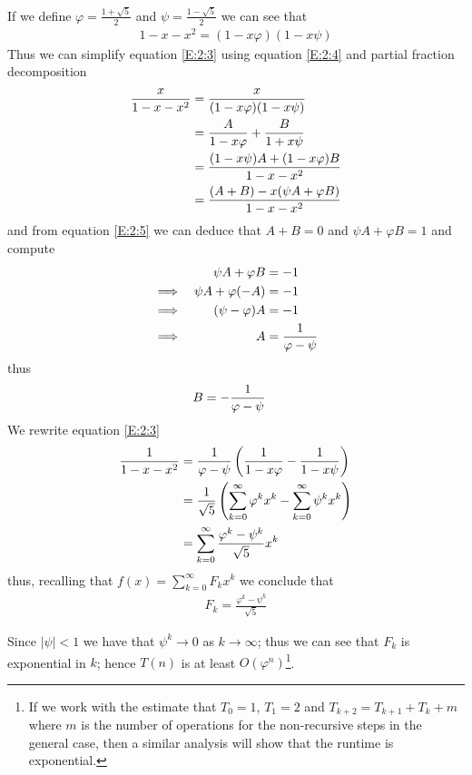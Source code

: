 \documentclass[oneside,12pt]{book}   	%
\newcounter{ex}
\newcounter{def}
\theoremstyle{definition}
\newcommand{\order}[1]{\left| #1 \right|}
\begin{document}
\begin{spacing}{1.618}
			If we define $\varphi=\frac{1+\sqrt{5}}{2}$ and $\psi=\frac{1-\sqrt{5}}{2}$ we can see that
			\begin{alignat}{4}
				1-x-x^2=(1-x\varphi)(1-x\psi) \label{E:2:4}
			\end{alignat}
			Thus we can simplify equation \ref{E:2:3} using equation \ref{E:2:4} and partial fraction decomposition
			\begin{alignat}{4}
				\frac{x}{1-x-x^2}&=\frac{x}{(1-x\varphi)(1-x\psi)} \notag \\
					&=\frac{A}{1-x\varphi}+\frac{B}{1+x\psi} \notag \\
					&=\frac{(1-x\psi)A+(1-x\varphi)B}{1-x-x^2} \notag \\
					&=\frac{(A+B)-x(\psi A+\varphi B)}{1-x-x^2} \label{E:2:5}
			\end{alignat}
			and from equation \ref{E:2:5} we can deduce that $A+B=0$ and $\psi A+\varphi B=1$ and compute
			\begin{alignat}{4}
				&&\psi A+\varphi B&=-1 \notag \\
				\implies && \psi A+ \varphi (-A)&=-1 \notag \\
				\implies && (\psi -\varphi) A &=-1 \notag \\
				\implies && A &=\frac{1}{\varphi-\psi} \notag 
			\end{alignat}
			thus
			\begin{alignat}{4}
				B&=-\frac{1}{\varphi-\psi} \notag
			\end{alignat}
			We rewrite equation \ref{E:2:3}
			\begin{alignat}{4}
				\frac{1}{1-x-x^2}&=\frac{1}{\varphi-\psi}\left(\frac{1}{1-x\varphi}-\frac{1}{1-x\psi}\right) \notag \\
					&=\frac{1}{\sqrt{5}}\left(\sum_{k=0}^\infty \varphi^kx^k - \sum_{k=0}^\infty \psi^kx^k\right) \notag \\
					&=\sum_{k=0}^\infty \frac{\varphi^k-\psi^k}{\sqrt{5}} x^k
			\end{alignat}
			thus, recalling that $f(x)=\sum_{k=0}^\infty F_kx^k$ we conclude that
			\begin{alignat}{4}
				F_k=\frac{\varphi^k-\psi^k}{\sqrt{5}} \label{E:2:7}
			\end{alignat}
			
			Since $\order{\psi}<1$ we have that $\psi^k\to 0$ as $k\to\infty$; thus we can see that $F_k$ is exponential in $k$; hence $T(n)$ is at least $O\left(\varphi^n\right)$\footnote{If we work with the estimate that $T_0=1$, $T_1=2$ and $T_{k+2}=T_{k+1}+T_k+m$ where $m$ is the number of operations for the non-recursive steps in the general case, then a similar analysis will show that the runtime is exponential.}. 
		

\end{spacing}
\end{document}

